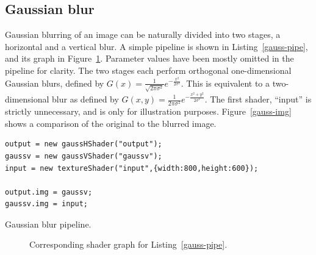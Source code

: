 \documentclass[12pt,twoside,notitlepage]{report}
\begin{document}
\subsection*{Gaussian blur}
Gaussian blurring of an image can be naturally divided into two stages, a horizontal and a vertical blur. A simple pipeline is shown in Listing~\ref{gauss-pipe}, and its graph in Figure~\ref{gauss-graph}. Parameter values have been mostly omitted in the pipeline for clarity. The two stages each perform orthogonal one-dimensional Gaussian blurs, defined by $G(x) = \frac{1}{\sqrt{2\pi \sigma^2}} e^{-\frac{x^2}{2 \sigma^2}}$. This is equivalent to a two-dimensional blur as defined by $G(x,y) = \frac{1}{2\pi \sigma^2} e^{-\frac{x^2 + y^2}{2 \sigma^2}}$. The first shader, ``input'' is strictly unnecessary, and is only for illustration purposes. Figure~\ref{gauss-img} shows a comparison of the original to the blurred image.

\begin{listing}[H]
\begin{verbatim}
output = new gaussHShader("output");
gaussv = new gaussVShader("gaussv");
input = new textureShader("input",{width:800,height:600});

output.img = gaussv;
gaussv.img = input;
\end{verbatim}
\caption{Gaussian blur pipeline.\label{gauss-pipe}}
\end{listing}

\begin{figure}

\caption{Corresponding shader graph for Listing~\ref{gauss-pipe}.\label{gauss-graph}}
\end{figure}
\end{document}
